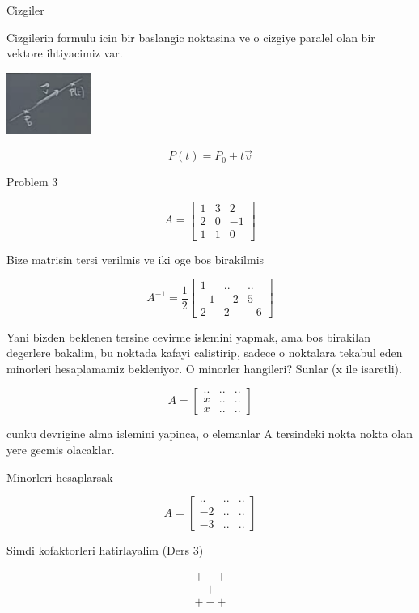 \documentclass[12pt,fleqn]{article}\usepackage{../common}
\begin{document}
Cizgiler

Cizgilerin formulu icin bir baslangic noktasina ve o cizgiye paralel olan
bir vektore ihtiyacimiz var. 

\includegraphics[height=2cm]{7_2.png}

\[ P(t) = P_0 + t \vec{v} \]

Problem 3

\[ A = 
\left[\begin{array}{rrr}
1 & 3 & 2 \\
2 & 0 & -1 \\
1 & 1 & 0
\end{array}\right]
 \]

Bize matrisin tersi verilmis ve iki oge bos birakilmis

\[ A^{-1} = \frac{1}{2}
\left[\begin{array}{rrr}
1 & .. & .. \\
-1 & -2 & 5 \\
2 & 2 & -6
\end{array}\right]
 \]

Yani bizden beklenen tersine cevirme islemini yapmak, ama bos birakilan
degerlere bakalim, bu noktada kafayi calistirip, sadece o noktalara tekabul 
eden minorleri hesaplamamiz bekleniyor. O minorler hangileri? Sunlar (x ile
isaretli). 

\[ A = 
\left[\begin{array}{rrr}
.. & .. & ..\\
x & .. & ..\\
x & .. & ..
\end{array}\right]
 \]

cunku devrigine alma islemini yapinca, o elemanlar A tersindeki nokta nokta olan
yere gecmis olacaklar. 

Minorleri hesaplarsak

\[ A = 
\left[\begin{array}{rrr}
.. & .. & ..\\
-2 & .. & ..\\
-3 & .. & ..
\end{array}\right]
 \]

Simdi kofaktorleri hatirlayalim (Ders 3)


\[ 
\begin{array}{rr}
+ - + \\
- + - \\
+ - + 
\end{array}
 \]
\end{document}
